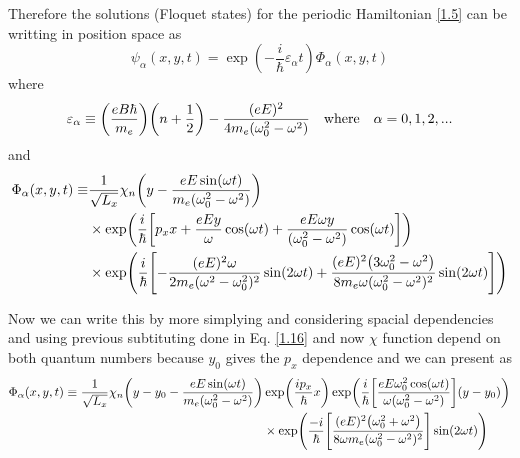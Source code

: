 \vspace{5mm}
\noindent
Therefore the solutions (Floquet states) for the periodic Hamiltonian \eqref{1.5} can be writting in position space as
\begin{equation} \label{3.17}
  \psi_{\alpha}(x,y,t) =
  \exp(-\frac{i}{\hbar}\varepsilon_{\alpha}t)   \Phi_{\alpha} (x,y,t)
\end{equation}
where
\begin{equation} \label{3.18}
  \varepsilon_{\alpha} \equiv
  \qty(\frac{eB\hbar }{m_e})\qty(n + \frac{1}{2}) -
  \frac{(eE)^2}{4m_e(\omega_0^2 - \omega^2)}
  \quad \text{where} \quad
  \alpha = 0,1,2, ...
\end{equation}
and
\begin{equation} \label{3.19}
  \begin{aligned}
    \Phi_{\alpha}(x,y,t) \equiv &
    \frac{1}{\sqrt{L_x}}
    \chi_{n}\qty(y - \frac{eE\sin(\omega t)}{m_e(\omega_0^2 - \omega^2)} ) \\
    & \times
    \exp(
     \frac{i}{\hbar}\qty[
     p_x x +
     \frac{eEy}{\omega}\cos(\omega t)+
     \frac{eE\omega y }{(\omega_0^2 - \omega^2)}\cos(\omega t)
     ])\\
     & \times
     \exp(\frac{i}{\hbar}\qty[
     -\frac{(eE)^2\omega }{2m_e(\omega^2 - \omega_0^2)^2}\sin(2\omega t)
     + \frac{(eE)^2\qty(3\omega_0^2 - \omega^2)}{8m_e\omega(\omega_0^2 - \omega^2)^2} \sin(2\omega t)
  ])
  \end{aligned}
\end{equation}

\noindent
Now we can write this by more simplying and considering spacial dependencies and using previous subtituting done in Eq. \eqref{1.16} and now $\chi$ function depend on both quantum numbers because $y_0$ gives the $p_x$ dependence and we can present as
\begin{equation} \label{3.20}
  \begin{aligned}
    \Phi_{\alpha}(x,y,t)  \equiv
    \frac{1}{\sqrt{L_x}}
    \chi_{n}\qty(y - y_0 - \frac{eE\sin(\omega t)}{m_e(\omega_0^2 - \omega^2)} ) &
    \exp( \frac{i p_x }{\hbar}x )
    \exp(
     \frac{i}{\hbar}
     \qty[
     \frac{eE\omega_0^2\cos(\omega t)}{\omega(\omega_0^2 - \omega^2)}]
     \qty(y - y_0 ))\\
     & \times
     \exp(\frac{-i}{\hbar}
     \qty[
     \frac{(eE)^2\qty(\omega_0^2 + \omega^2)}{8\omega m_e(\omega_0^2 - \omega^2)^2}
     ]\sin(2\omega t)
     )
  \end{aligned}
\end{equation}


